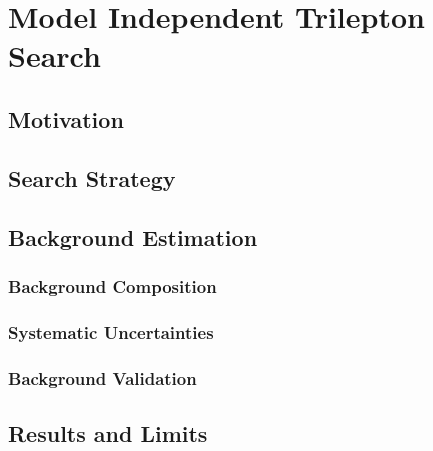 \chapter{Model Independent Trilepton Search}
\section{Motivation}

\section{Search Strategy}

\section{Background Estimation}

\subsection{Background Composition}

\subsection{Systematic Uncertainties}

\subsection{Background Validation}

\section{Results and Limits}
